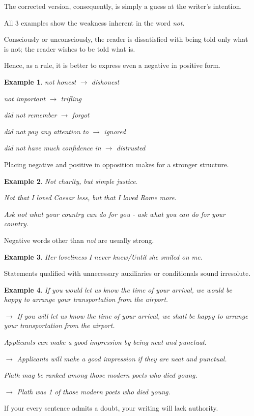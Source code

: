 \documentclass{book}
\numberwithin{equation}{section}
\newtheorem{example}{Example}[chapter]
\begin{document}
The corrected version, consequently, is simply a guess at the writer's intention.

%
All 3 examples show the weakness inherent in the word \textit{not}.

Consciously or unconsciously, the reader is dissatisfied with being told only what is not; the reader wishes to be told what is.

Hence, as a rule, it is better to express even a negative in positive form.
\begin{example}
    not honest $\to$ dishonest
    
    not important $\to$ trifling
    
    did not remember $\to$ forgot
    
    did not pay any attention to $\to$ ignored
    
    did not have much confidence in $\to$ distrusted
\end{example}
Placing negative and positive in opposition makes for a stronger structure.
\begin{example}
    Not charity, but simple justice.
    
    Not that I loved Caesar less, but that I loved Rome more.
    
    Ask not what your country can do for you - ask what you can do for your country.
\end{example}
Negative words other than \textit{not} are usually strong.
\begin{example}
    Her loveliness I never knew/Until she smiled on me.
\end{example}
Statements qualified with unnecessary auxiliaries or conditionals sound irresolute.
\begin{example}
    If you would let us know the time of your arrival, we would be happy to arrange your transportation from the airport.
    
    $\to$ If you will let us know the time of your arrival, we shall be happy to arrange your transportation from the airport.
    
    Applicants can make a good impression by being neat and punctual.
    
    $\to$ Applicants will make a good impression if they are neat and punctual.
    
    Plath may be ranked among those modern poets who died young.
    
    $\to$ Plath was 1 of those modern poets who died young.
\end{example}
If your every sentence admits a doubt, your writing will lack authority.
\end{document}
